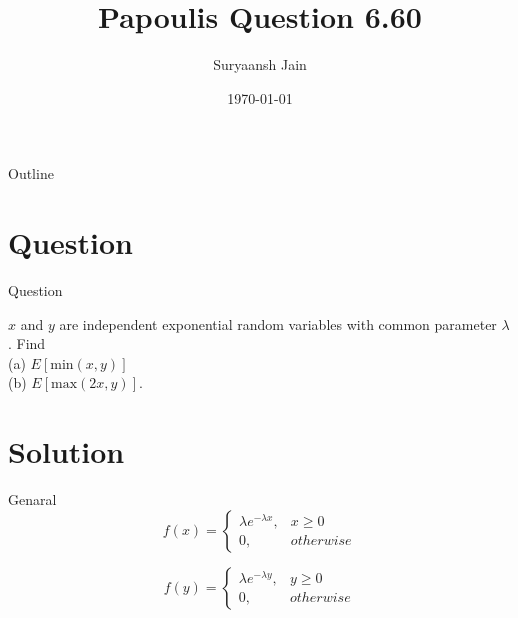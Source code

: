 \documentclass{beamer}
\title{Papoulis Question 6.60}
\author{Suryaansh Jain}
\date{\today}
\begin{document}
\begin{frame}
    \titlepage 
\end{frame}

\logo{}


\begin{frame}{Outline}
    \tableofcontents
\end{frame}


\section{Question}
\begin{frame}{Question}

$x$ and $y$ are independent exponential random variables with common parameter $\lambda$. Find \\
(a) $E[\text{min}(x, y)]$ \\
(b) $E[\text{max}(2x, y)]$.
\end{frame}

\section{Solution}
\begin{frame}{Genaral}
    \begin{equation}
        f(x) = 
        \begin{cases}
            \lambda e^{-\lambda x}, & x \geq 0 \\
            0, & otherwise
        \end{cases}
    \end{equation}
        
    \begin{equation}
        f(y) = 
        \begin{cases}
            \lambda e^{-\lambda y}, & y \geq 0 \\
            0, & otherwise
        \end{cases}
    \end{equation}
\end{frame} 
\end{document}
